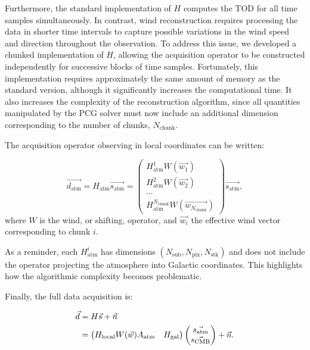\documentclass[../../thesis.tex]{subfiles}
\begin{document}
Furthermore, the standard implementation of $H$ computes the TOD for all time samples simultaneously. In contrast, wind reconstruction requires processing the data in shorter time intervals to capture possible variations in the wind speed and direction throughout the observation. To address this issue, we developed a chunked implementation of $H$, allowing the acquisition operator to be constructed independently for successive blocks of time samples. Fortunately, this implementation requires approximately the same amount of memory as the standard version, although it significantly increases the computational time. It also increases the complexity of the reconstruction algorithm, since all quantities manipulated by the PCG solver must now include an additional dimension corresponding to the number of chunks, $N_{\mathrm{chunk}}$.

The acquisition operator observing in local coordinates can be written:

\begin{equation}
    \vec{d_\text{atm}} = H_\text{atm}\vec{s_\text{atm}} = \begin{pmatrix}
        H_{\text{atm}}^{1} W(\vec{w_1}) \\
        H_{\text{atm}}^{2} W(\vec{w_2}) \\
        \cdots \\
        H_{\text{atm}}^{N_\text{chunk}} W(\vec{w_{N_\text{chunk}}})
        \end{pmatrix} \vec{s_\text{atm}},
\end{equation}
where $W$ is the wind, or shifting, operator, and $\vec{w_i}$ the effective wind vector corresponding to chunk $i$.

As a reminder, each $H_{\text{atm}}^{i}$ has dimensions $\left(N_\text{sub}, N_\text{pix}, N_\text{stk}\right)$ and does not include the operator projecting the atmosphere into Galactic coordinates. This highlights how the algorithmic complexity becomes problematic.

Finally, the full data acquisition is:

\begin{align} \label{eq:atm_data_model}
    \vec{d} &= H\vec{s} + \vec{n} \notag \\
    &= \begin{pmatrix}
        H_\text{local} W(\vec{w}) A_\text{atm} & H_\text{gal}
    \end{pmatrix} \begin{pmatrix}
        \vec{s_\text{atm}} \\
        \vec{s_\text{CMB}}
    \end{pmatrix} + \vec{n}.
\end{align}
\end{document}
